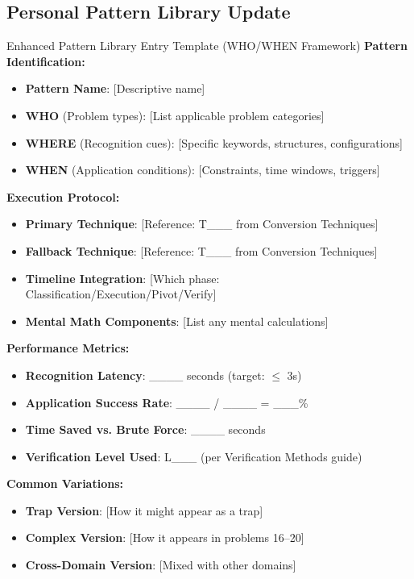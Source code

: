 \documentclass{article}
\begin{document}
\subsection{Personal Pattern Library Update}

\begin{analysisbox}{Enhanced Pattern Library Entry Template (WHO/WHEN Framework)}
\textbf{Pattern Identification:}
\begin{itemize}[nosep]
\item \textbf{Pattern Name}: [Descriptive name]
\item \textbf{WHO} (Problem types): [List applicable problem categories]
\item \textbf{WHERE} (Recognition cues): [Specific keywords, structures, configurations]
\item \textbf{WHEN} (Application conditions): [Constraints, time windows, triggers]
\end{itemize}

\textbf{Execution Protocol:}
\begin{itemize}[nosep]
\item \textbf{Primary Technique}: [Reference: T\_\_\_ from Conversion Techniques]
\item \textbf{Fallback Technique}: [Reference: T\_\_\_ from Conversion Techniques]
\item \textbf{Timeline Integration}: [Which phase: Classification/Execution/Pivot/Verify]
\item \textbf{Mental Math Components}: [List any mental calculations]
\end{itemize}

\textbf{Performance Metrics:}
\begin{itemize}[nosep]
\item \textbf{Recognition Latency}: \_\_\_\_ seconds (target: $\leq$ 3s)
\item \textbf{Application Success Rate}: \_\_\_\_ / \_\_\_\_ = \_\_\_\%
\item \textbf{Time Saved vs. Brute Force}: \_\_\_\_ seconds
\item \textbf{Verification Level Used}: L\_\_\_ (per Verification Methods guide)
\end{itemize}

\textbf{Common Variations:}
\begin{itemize}[nosep]
\item \textbf{Trap Version}: [How it might appear as a trap]
\item \textbf{Complex Version}: [How it appears in problems 16--20]
\item \textbf{Cross-Domain Version}: [Mixed with other domains]
\end{itemize}
\end{analysisbox}
\end{document}
